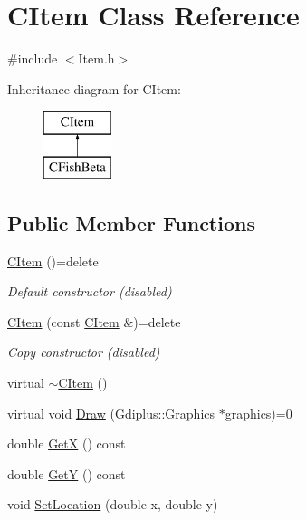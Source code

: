 \hypertarget{class_c_item}{}\section{C\+Item Class Reference}
\label{class_c_item}


{\ttfamily \#include $<$Item.\+h$>$}

Inheritance diagram for C\+Item\+:\begin{figure}[H]
\begin{center}
\leavevmode
\includegraphics[height=2.000000cm]{class_c_item}
\end{center}
\end{figure}
\subsection*{Public Member Functions}
\begin{DoxyCompactItemize}
\item 
\mbox{\label{class_c_item_ac2ea847c008cf8d1de92c870c8f8262f}} 
\mbox{\hyperlink{class_c_item_ac2ea847c008cf8d1de92c870c8f8262f}{C\+Item}} ()=delete
\begin{DoxyCompactList}\small\item\em Default constructor (disabled) \end{DoxyCompactList}\item 
\mbox{\label{class_c_item_a7d6042bbb9a571d2dc1d1f89016a97c8}} 
\mbox{\hyperlink{class_c_item_a7d6042bbb9a571d2dc1d1f89016a97c8}{C\+Item}} (const \mbox{\hyperlink{class_c_item}{C\+Item}} \&)=delete
\begin{DoxyCompactList}\small\item\em Copy constructor (disabled) \end{DoxyCompactList}\item 
virtual \mbox{\hyperlink{class_c_item_a2487c6e822ed0e850544f1745b43f584}{$\sim$\+C\+Item}} ()
\item 
virtual void \mbox{\hyperlink{class_c_item_a7ef8448d0c4bc53d0f1943a4dc817f6f}{Draw}} (Gdiplus\+::\+Graphics $\ast$graphics)=0
\item 
double \mbox{\hyperlink{class_c_item_a394d38a058fc53f0e958ca52248560c8}{GetX}} () const
\item 
double \mbox{\hyperlink{class_c_item_ac0fe6be80f8ef19854d7f41b4803f658}{GetY}} () const
\item 
void \mbox{\hyperlink{class_c_item_a9c194f3f08e515853600cecca3e6d319}{Set\+Location}} (double x, double y)
\end{DoxyCompactItemize}
